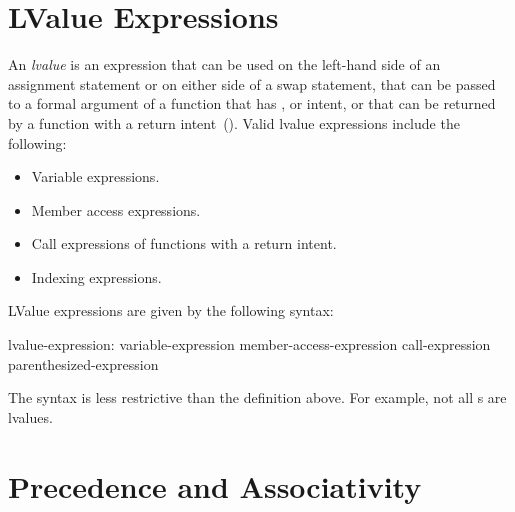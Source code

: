 \section{LValue Expressions}
\label{LValue_Expressions}

An {\em lvalue} is an expression that can be used on the left-hand
side of an assignment statement or on either side of a swap statement,
that can be passed to a formal argument of a function that
has ,  or  intent, or that can be returned by a
function with a  return intent~().  Valid
lvalue expressions include the following:
\begin{itemize}
\item
 Variable expressions.
\item
 Member access expressions.
\item
 Call expressions of functions with a  return intent.
\item
 Indexing expressions.
\end{itemize}

LValue expressions are given by the following syntax:
\begin{syntax}
lvalue-expression:
  variable-expression
  member-access-expression
  call-expression
  parenthesized-expression
\end{syntax}
The syntax is less restrictive than the definition above.  For
example, not all s are lvalues.

\section{Precedence and Associativity}
\label{Operator_Precedence_and_Associativity}

